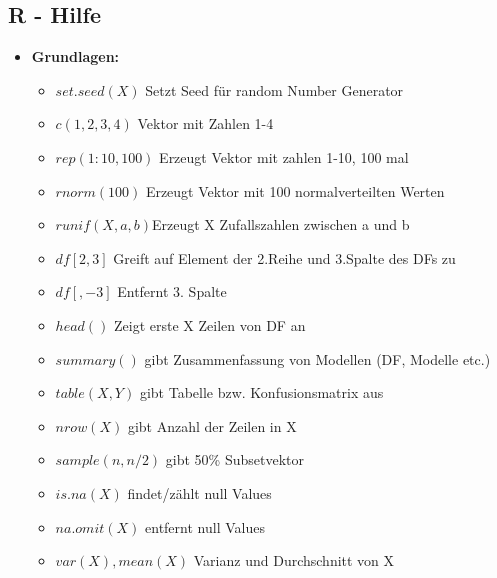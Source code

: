 \documentclass[a4paper]{article}
\begin{document}
\begin{landscape}
\begin{multicols}{3}
        \section{R - Hilfe}
        \begin{itemize} [noitemsep,nolistsep,leftmargin=*]
            \item \textbf{Grundlagen:}
            \begin{itemize}[noitemsep,nolistsep,leftmargin=*]
                \item $set.seed(X)$ Setzt Seed für random Number Generator
                \item $c(1,2,3,4)$ Vektor mit Zahlen 1-4
                \item $rep(1:10, 100)$ Erzeugt Vektor mit zahlen 1-10, 100 mal
                \item $rnorm(100)$ Erzeugt Vektor mit 100 normalverteilten Werten
                \item $runif(X, a,b)$Erzeugt X Zufallszahlen zwischen a und b
                \item $df[2,3]$ Greift auf Element der 2.Reihe und 3.Spalte des DFs zu
                \item $df[,-3]$ Entfernt 3. Spalte
                \item $head()$ Zeigt erste X Zeilen von DF an
                \item $summary()$ gibt Zusammenfassung von Modellen (DF, Modelle etc.)
                \item $table(X,Y)$ gibt Tabelle bzw. Konfusionsmatrix aus
                \item $nrow(X)$ gibt Anzahl der Zeilen in X
                \item $sample(n, n/2)$ gibt 50\% Subsetvektor
                \item $is.na(X)$ findet/zählt null Values
                \item $na.omit(X)$ entfernt null Values
                \item $var(X), mean(X)$ Varianz und Durchschnitt von X
            \end{itemize}


\end{itemize}
\end{multicols}
\end{landscape}
\end{document}
